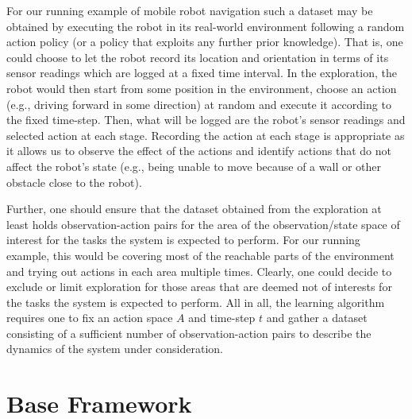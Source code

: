 For our running example of mobile robot navigation such a dataset may be obtained by executing the robot in its real-world environment following a random action policy (or a policy that exploits any further prior knowledge).
That is, one could choose to let the robot record its location and orientation in terms of its sensor readings which are logged at a fixed time interval.
In the exploration, the robot would then start from some position in the environment, choose an action (e.g., driving forward in some direction) at random and execute it according to the fixed time-step.
Then, what will be logged are the robot's sensor readings and selected action at each stage.
Recording the action at each stage is appropriate as it allows us to observe the effect of the actions and identify actions that do not affect the robot's state (e.g., being unable to move because of a wall or other obstacle close to the robot).

Further, one should ensure that the dataset obtained from the exploration at least holds observation-action pairs for the area of the observation/state space of interest for the tasks the system is expected to perform.
For our running example, this would be covering most of the reachable parts of the environment and trying out actions in each area multiple times.
Clearly, one could decide to exclude or limit exploration for those areas that are deemed not of interests for the tasks the system is expected to perform.
All in all, the learning algorithm requires one to fix an action space $A$ and time-step $t$ and gather a dataset consisting of a sufficient number of observation-action pairs to describe the dynamics of the system under consideration.

\newpage

\section{Base Framework}
\label{sec:model-learning-routine}


